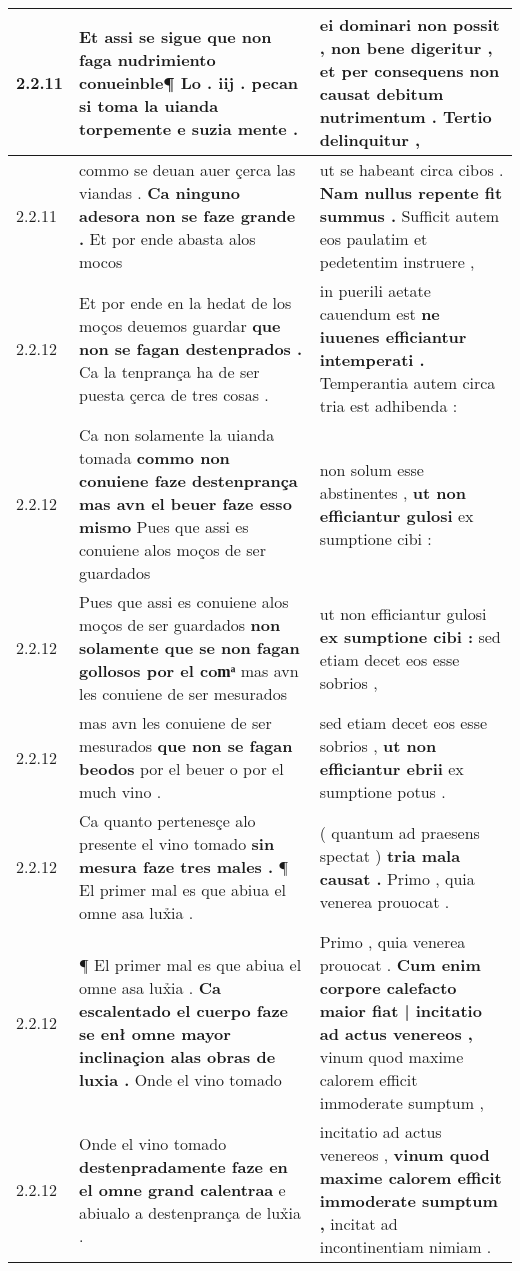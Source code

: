 \begin{tabular}{|p{1cm}|p{6.5cm}|p{6.5cm}|}
2.2.11 & Et assi se sigue \textbf{ que non faga nudrimiento conueinble¶ Lo . iij . } pecan si toma la uianda torpemente e suzia mente . & ei dominari non possit , non bene digeritur , \textbf{ et per consequens non causat debitum nutrimentum . } Tertio delinquitur , \\\hline
2.2.11 & commo se deuan auer çerca las viandas . \textbf{ Ca ninguno adesora non se faze grande . } Et por ende abasta alos mocos & ut se habeant circa cibos . \textbf{ Nam nullus repente fit summus . } Sufficit autem eos paulatim et pedetentim instruere , \\\hline
2.2.12 & Et por ende en la hedat de los moços deuemos guardar \textbf{ que non se fagan destenprados . } Ca la tenprança ha de ser puesta çerca de tres cosas . & in puerili aetate cauendum est \textbf{ ne iuuenes efficiantur intemperati . } Temperantia autem circa tria est adhibenda : \\\hline
2.2.12 & Ca non solamente la uianda tomada \textbf{ commo non conuiene faze destenprança mas avn el beuer faze esso mismo } Pues que assi es conuiene alos moços de ser guardados & non solum esse abstinentes , \textbf{ ut non efficiantur gulosi } ex sumptione cibi : \\\hline
2.2.12 & Pues que assi es conuiene alos moços de ser guardados \textbf{ non solamente que se non fagan gollosos por el comͣ } mas avn les conuiene de ser mesurados & ut non efficiantur gulosi \textbf{ ex sumptione cibi : } sed etiam decet eos esse sobrios , \\\hline
2.2.12 & mas avn les conuiene de ser mesurados \textbf{ que non se fagan beodos } por el beuer o por el much vino . & sed etiam decet eos esse sobrios , \textbf{ ut non efficiantur ebrii } ex sumptione potus . \\\hline
2.2.12 & Ca quanto pertenesçe alo presente el vino tomado \textbf{ sin mesura faze tres males . } ¶ El primer mal es que abiua el omne asa lux̉ia . & ( quantum ad praesens spectat ) \textbf{ tria mala causat . } Primo , quia venerea prouocat . \\\hline
2.2.12 & ¶ El primer mal es que abiua el omne asa lux̉ia . \textbf{ Ca escalentado el cuerpo faze se enł omne mayor inclinaçion alas obras de luxia . } Onde el vino tomado & Primo , quia venerea prouocat . \textbf{ Cum enim corpore calefacto maior fiat | incitatio ad actus venereos , } vinum quod maxime calorem efficit immoderate sumptum , \\\hline
2.2.12 & Onde el vino tomado \textbf{ destenpradamente faze en el omne grand calentraa } e abiualo a destenprança de lux̉ia . & incitatio ad actus venereos , \textbf{ vinum quod maxime calorem efficit immoderate sumptum , } incitat ad incontinentiam nimiam . \\\hline

\end{tabular}
